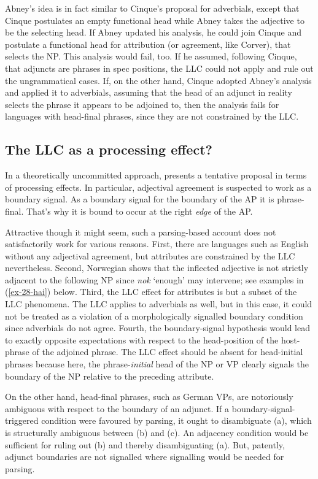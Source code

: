 \documentclass[output=paper
  ,nobabel
  ,uniformtopskip %
]{langscibook}
\begin{document}
\noindent
Abney's idea is in fact similar to Cinque's proposal for adverbials, except that Cinque postulates an empty functional head while Abney takes the adjective to be the selecting head. If Abney updated his analysis, he could join Cinque and postulate a functional head for attribution (or agreement, like Corver), that selects the NP. This analysis would fail, too. If he assumed, following Cinque, that adjuncts are phrases in spec positions, the LLC could not apply and rule out the ungrammatical cases. If, on the other hand, Cinque adopted Abney's analysis and applied it to adverbials, assuming that the head of an adjunct in reality selects the phrase it appears to be adjoined to, then the analysis fails for languages with head-final phrases, since they are not constrained by the LLC.

\subsection{The LLC as a processing effect?}\label{subsec-llc}

In a theoretically uncommitted approach, \citet{Fischer2016} presents a tentative proposal in terms of processing effects. In particular, adjectival agreement is suspected to work as a boundary signal. As a boundary signal for the boundary of the AP it is phrase-final. That's why it is bound to occur at the right \emph{edge} of the AP.

Attractive though it might seem, such a parsing-based account does not satisfactorily work for
various reasons. First, there are languages such as English without any adjectival agreement, but
attributes are constrained by the LLC nevertheless. Second, Norwegian shows that the inflected
adjective is not strictly adjacent to the following NP since \emph{nok} `enough' may intervene; see
examples in (\ref{ex-28-hai}) below. Third, the LLC effect for attributes is but a subset of the LLC
phenomena. The LLC applies to adverbials as well, but in this case, it could not be treated as a
violation of a morphologically signalled boundary condition since adverbials do not agree. Fourth,
the boundary-signal hypothesis would lead to exactly opposite expectations with respect to the
head-position of the host-phrase of the adjoined phrase. The LLC effect should be absent for
head-initial phrases because here, the phrase-\emph{initial} head of the NP or VP clearly signals
the boundary of the NP relative to the preceding attribute. 

On the other hand, head-final phrases,
such as German VPs, are notoriously ambiguous with respect to the boundary of an adjunct. 
If a boundary-signal-triggered condition were favoured by parsing, it ought to disambiguate (a), which is structurally ambiguous between (b) and (c). An adjacency condition would be sufficient for ruling out (b) and thereby disambiguating (a). But, patently, adjunct boundaries are not signalled where signalling would be needed for parsing.
\end{document}
